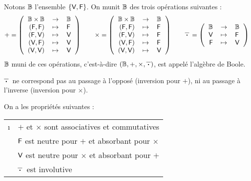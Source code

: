 		\begin{Definition}
			Notons \(\bb{B}\) l'ensemble \(\{\V,\F\}\). On munit \(\bb{B}\) des trois opérations suivantes :
				\setlength{\tabcolsep}{2.2pt}
				\[
					+ = \left( \begin{tabular}[h]{rcl}
						\(\bb{B} \times \bb{B}\) & \(\rightarrow\) & \(\bb{B}\) \\
						\((\F,\F)\) & \(\mapsto\) & \(\F\) \\
						\((\F,\V)\) & \(\mapsto\) & \(\V\) \\
						\((\V,\F)\) & \(\mapsto\) & \(\V\) \\
						\((\V,\V)\) & \(\mapsto\) & \(\V\)
					\end{tabular} \right)
					\qquad
					\times = \left( \begin{tabular}[h]{rcl}
						\(\bb{B} \times \bb{B}\) & \(\rightarrow\) & \(\bb{B}\) \\
						\((\F,\F)\) & \(\mapsto\) & \(\F\) \\
						\((\F,\V)\) & \(\mapsto\) & \(\F\) \\
						\((\V,\F)\) & \(\mapsto\) & \(\F\) \\
						\((\V,\V)\) & \(\mapsto\) & \(\V\)
					\end{tabular} \right)
					\qquad
					\boolinv = \left( \begin{tabular}[h]{rcl}
						\(\bb{B}\) & \(\rightarrow\) & \(\bb{B}\) \\
						\(\V\) & \(\mapsto\) & \(\F\) \\
						\(\F\) & \(\mapsto\) & \(\V\)
					\end{tabular} \right)
				\]
			\(\bb{B}\) muni de ces opérations, c'est-à-dire \((\bb{B},+,\times,\boolinv \!)\), est appelé l'algèbre de Boole.
		\end{Definition} \setlength{\tabcolsep}{5pt}
		
		\begin{Remarque}
			\(\boolinv\) ne correspond pas au passage à l'opposé (inversion pour \(+\)), ni au passage à l'inverse (inversion pour \(\times\)).
		\end{Remarque}
		
		\colsep{1.5pt}
		\begin{Proprietes}
			On a les propriétés suivantes : \!\begin{tabular}[t]{cl}
			\i & \(+\) et \(\times\) sont associatives et commutatives \\
			\ii & \(\F\) est neutre pour \(+\) et absorbant pour \(\times\) \\
			\iii & \(\V\) est neutre pour \(\times\) et absorbant pour \(+\) \\
			\iv & \(\boolinv\) est involutive
			\end{tabular}
		\end{Proprietes}
		
